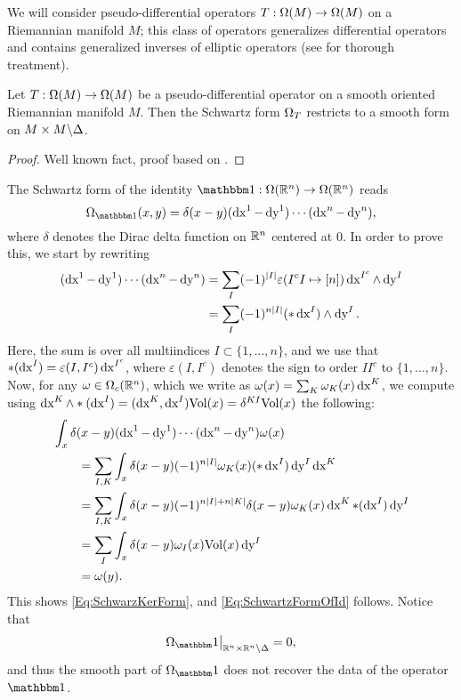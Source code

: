 \documentclass[\MainFolder/Text.tex]{subfiles}
\begin{document}
We will consider pseudo-differential operators $T:\Omega(M)\rightarrow\Omega(M)$ on a Riemannian manifold $M$; this class of operators generalizes differential operators and contains generalized inverses of elliptic operators (see \cite{Hormander} for thorough treatment).

\begin{Proposition} \label{Prop:ASD}
Let $T: \Omega(M) \rightarrow \Omega(M)$ be a pseudo-differential operator on a smooth oriented Riemannian manifold $M$. Then the Schwartz form $\Omega_{T}$ restricts to a smooth form on $M\times M\backslash\Delta$.
\end{Proposition}
\begin{proof}
Well known fact, proof based on \cite{Hormander}.
\end{proof}
 
\begin{Example}\label{Ex:IdFE}The Schwartz form of the identity $\Id: \DR(\R^n)\rightarrow \DR(\R^n)$ reads
\begin{equation}\label{Eq:SchwartzFormOfId}
\DR_{\Id}(x,y) = \delta(x-y)(\Diff{x}^1 - \Diff{y}^1)\dotsb(\Diff{x}^n-\Diff{y}^n),
\end{equation}
where $\delta$ denotes the Dirac delta function on $\mathbb{R}^n$ centered at $0$. In order to prove this, we start by rewriting
\begin{align*}
(\operatorname{dx}^1 - \operatorname{dy}^1) \dotsb (\operatorname{dx}^n - \operatorname{dy}^n) &=\sum_{I}(-1)^{|I|} \varepsilon(I^c I \mapsto[n])\operatorname{dx}^{I^c} \wedge \operatorname{dy}^I \\
&=\sum_{I} (-1)^{n |I|} (* \operatorname{dx}^I) \wedge \operatorname{dy}^I.
\end{align*}
Here, the sum is over all multiindices $I\subset \{1,\dotsc,n\}$, and we use that $*(\operatorname{dx}^I) = \varepsilon(I, I^c) \operatorname{dx}^{I^c}$, where $\varepsilon(I,I^c)$ denotes the sign to order $I I^c$ to $\{1,\dotsc,n\}$. Now, for any $\omega\in \Omega_c(\mathbb{R}^n)$, which we write as $\omega(x) = \sum_K \omega_K(x)\operatorname{dx}^K$, we compute using $\operatorname{dx}^K\wedge*(\operatorname{dx}^I)=(\operatorname{dx}^K,\operatorname{dx}^I)\mathrm{Vol}(x) = \delta^{KI}\mathrm{Vol}(x)$ the following:
\begin{align*}
&\int_x \delta(x-y)  (\operatorname{dx}^1-\operatorname{dy}^1)\dotsb(\operatorname{dx}^n-\operatorname{dy}^n) \omega(x)  \\
&\qquad=\sum_{I,K} \int_x \delta(x-y)(-1)^{n|I|}  \omega_K(x)(* \operatorname{dx}^I)\operatorname{dy}^I\operatorname{dx}^K \\
&\qquad=\sum_{I,K}\int_x \delta(x-y) (-1)^{n|I| + n|K|} \delta(x-y)  \omega_K(x) \operatorname{dx}^K *(\operatorname{dx}^I) \operatorname{dy}^I \\
&\qquad=\sum_{I} \int_x \delta(x-y) \omega_I(x)\mathrm{Vol}(x) \operatorname{dy}^I \\
&\qquad=\omega(y).
\end{align*}
This shows \eqref{Eq:SchwarzKerForm}, and \eqref{Eq:SchwartzFormOfId} follows. Notice that
$$ \Restr{\DR_\Id}{\R^n\times \R^n\backslash \Diag} = 0, $$
and thus the smooth part of $\DR_\Id$ does not recover the data of the operator $\Id$.
\end{Example}
\end{document}
